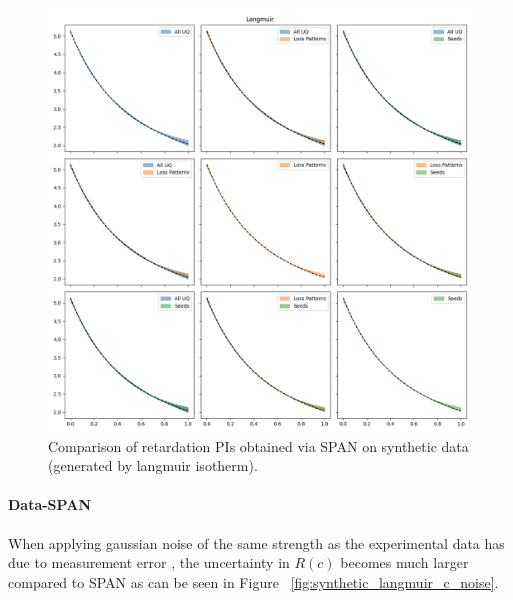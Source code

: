 \begin{figure}[h]
    \centering
    \includegraphics{figs/finn_synthetic_SPAN_factors_PIs.png}
    \caption{Comparison of retardation PIs obtained via SPAN on synthetic data (generated by langmuir isotherm).}
    \label{fig:synthetic_SPAN_factors_PIs}
\end{figure}

\paragraph{Data-SPAN}
When applying gaussian noise of the same strength as the experimental data has due to measurement error \cite{nowak2016entropy}, the uncertainty in $R(c)$ becomes much larger compared to SPAN as can be seen in Figure ~\vref{fig:synthetic_langmuir_c_noise}.

